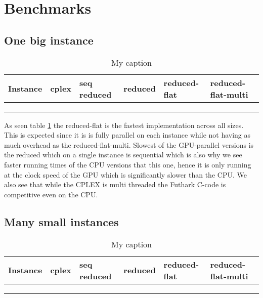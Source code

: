 \section{Benchmarks}
\subsection{One big instance}
\begin{table}[H]
	\centering
	\caption{My caption}
	\label{tabel:one_big_instance}
	\begin{tabular}{|l|l|l|l|l|l|}\hline
		Instance & cplex & seq reduced & reduced & reduced-flat & reduced-flat-multi \\\hline
		&       &             &         &              &                    \\\hline
		&       &             &         &              &                    \\\hline
		&       &             &         &              &                   \\\hline
	\end{tabular}
\end{table}

As seen table \ref{tabel:one_big_instance} the reduced-flat is the fastest implementation across all sizes. This is expected since it is is fully parallel on each instance while not having as much overhead as the reduced-flat-multi. Slowest of the GPU-parallel versions is the reduced which on a single instance is sequential which is also why we see faster running times of the CPU versions that this one, hence it is only running at the clock speed of the GPU which is significantly slower than the CPU. We also see that while the CPLEX is multi threaded the Futhark C-code is competitive even on the CPU. 

\subsection{Many small instances}
\begin{table}[H]
	\centering
	\caption{My caption}
	\label{tabel:many_small_instances}
	\begin{tabular}{|l|l|l|l|l|l|}\hline
		Instance & cplex & seq reduced & reduced & reduced-flat & reduced-flat-multi \\\hline
		&       &             &         &              &                    \\\hline
		&       &             &         &              &                    \\\hline
		&       &             &         &              &                   \\\hline
	\end{tabular}
\end{table}

